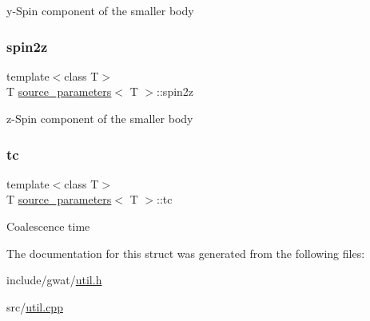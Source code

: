 y-\/\+Spin component of the smaller body \mbox{\label{structsource__parameters_a1dfb782bc530dd8bc64a8a454da4e698}} 
\subsubsection{\texorpdfstring{spin2z}{spin2z}}
{\footnotesize\ttfamily template$<$class T$>$ \\
T \hyperlink{structsource__parameters}{source\+\_\+parameters}$<$ T $>$\+::spin2z}

z-\/\+Spin component of the smaller body \mbox{\label{structsource__parameters_ac0c03ead9615b4c9f27d160ad023db70}} 
\subsubsection{\texorpdfstring{tc}{tc}}
{\footnotesize\ttfamily template$<$class T$>$ \\
T \hyperlink{structsource__parameters}{source\+\_\+parameters}$<$ T $>$\+::tc}

Coalescence time 

The documentation for this struct was generated from the following files\+:\begin{DoxyCompactItemize}
\item 
include/gwat/\hyperlink{util_8h}{util.\+h}\item 
src/\hyperlink{util_8cpp}{util.\+cpp}\end{DoxyCompactItemize}
